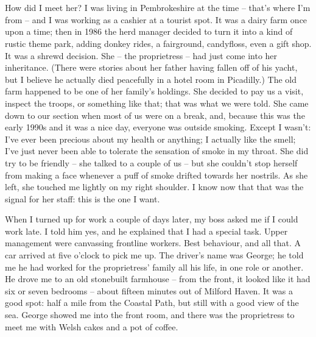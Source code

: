 \renewcommand{\thesection}{\Roman{section}} 


\section{}

How did I meet her? I was living in Pembrokeshire at the time -- that's where I'm from -- and I was working as a cashier at a tourist spot. It was a dairy farm once upon a time; then in 1986 the herd manager decided to turn it into a kind of rustic theme park, adding donkey rides, a fairground, candyfloss, even a gift shop. It was a shrewd decision. She -- the proprietress -- had just come into her inheritance. (There were stories about her father having fallen off of his yacht, but I believe he actually died peacefully in a hotel room in Picadilly.) The old farm happened to be one of her family's holdings. She decided to pay us a visit, inspect the troops, or something like that; that was what we were told. She came down to our section when most of us were on a break, and, because this was the early 1990s and it was a nice day, everyone was outside smoking. Except I wasn't: I've ever been precious about my health or anything; I actually like the smell; I've just never been able to tolerate the sensation of smoke in my throat. She did try to be friendly -- she talked to a couple of us -- but she couldn't stop herself from making a face whenever a puff of smoke drifted towards her nostrils. As she left, she touched me lightly on my right shoulder. I know now that that was the signal for her staff: this is the one I want.

When I turned up for work a couple of days later, my boss asked me if I could work late. I told him yes, and he explained that I had a special task. Upper management were canvassing frontline workers. Best behaviour, and all that. A car arrived at five o'clock to pick me up. The driver's name was George; he told me he had worked for the proprietress' family all his life, in one role or another. He drove me to an old stonebuilt farmhouse -- from the front, it looked like it had six or seven bedrooms -- about fifteen minutes out of Milford Haven. It was a good spot: half a mile from the Coastal Path, but still with a good view of the sea. George showed me into the front room, and there was the proprietress to meet me with Welsh cakes and a pot of coffee.


